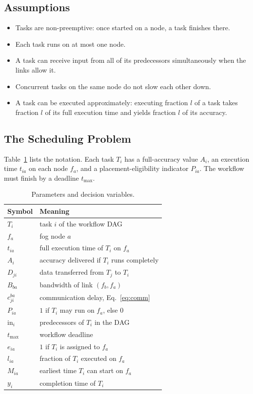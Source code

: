 \documentclass[conference]{IEEEtran}
\begin{document}
\subsection{Assumptions}
\begin{itemize}
    \item Tasks are non-preemptive: once started on a node, a task finishes there.
    \item Each task runs on at most one node.
    \item A task can receive input from all of its predecessors simultaneously when the links allow it.
    \item Concurrent tasks on the same node do not slow each other down.
    \item A task can be executed approximately: executing fraction $l$ of a task takes fraction $l$ of its full execution time and yields fraction $l$ of its accuracy.
\end{itemize}

\subsection{The Scheduling Problem}

Table~\ref{tab:notation} lists the notation. Each task $T_i$ has a full-accuracy value $A_i$, an execution time $t_{ia}$ on each node $f_a$, and a placement-eligibility indicator $P_{ia}$. The workflow must finish by a deadline $t_{\max}$.

\begin{table}[t]
\centering
\caption{Parameters and decision variables.}
\label{tab:notation}
\small
\begin{tabular}{ll}
\toprule
\textbf{Symbol} & \textbf{Meaning} \\
\midrule
$T_i$ & task $i$ of the workflow DAG \\
$f_a$ & fog node $a$ \\
$t_{ia}$ & full execution time of $T_i$ on $f_a$ \\
$A_i$ & accuracy delivered if $T_i$ runs completely \\
$D_{ji}$ & data transferred from $T_j$ to $T_i$ \\
$B_{ba}$ & bandwidth of link $(f_b,f_a)$ \\
$c_{ji}^{ba}$ & communication delay, Eq.~\eqref{eq:comm} \\
$P_{ia}$ & $1$ if $T_i$ may run on $f_a$, else $0$ \\
$\mathrm{in}_i$ & predecessors of $T_i$ in the DAG \\
$t_{\max}$ & workflow deadline \\
\midrule
$e_{ia}$ & $1$ if $T_i$ is assigned to $f_a$ \\
$l_{ia}$ & fraction of $T_i$ executed on $f_a$ \\
$M_{ia}$ & earliest time $T_i$ can start on $f_a$ \\
$y_i$ & completion time of $T_i$ \\
\bottomrule
\end{tabular}
\end{table}
\end{document}
